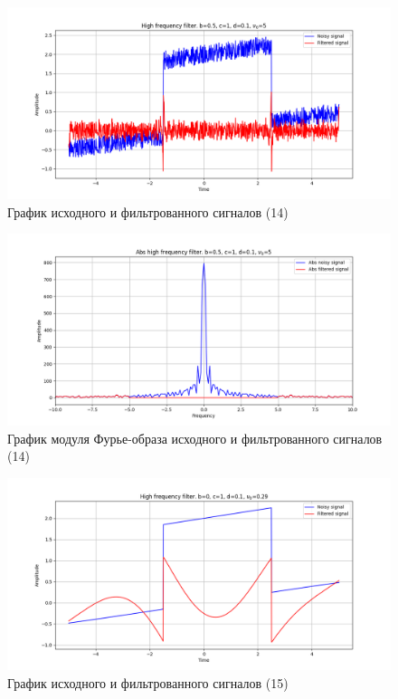 \documentclass[a4paper, 12pt]{article}
\begin{document}
    \begin{figure}[!htb]
        \centering
        \includegraphics[scale=0.48]{14_u_flt_u_nolow.png}
        \captionsetup{skip=0pt}
        \caption{График исходного и фильтрованного сигналов (14)}
        \label{fig:fig53}
    \end{figure}
    \begin{figure}[!htb]
        \centering
        \includegraphics[scale=0.48]{14_abs_u_U_nolow.png}
        \captionsetup{skip=0pt}
        \caption{График модуля Фурье-образа исходного и фильтрованного сигналов (14)}
        \label{fig:fig54}
    \end{figure}
    \begin{figure}[!htb]
        \centering
        \includegraphics[scale=0.48]{15_u_flt_u_nolow.png}
        \captionsetup{skip=0pt}
        \caption{График исходного и фильтрованного сигналов (15)}
        \label{fig:fig55}
    \end{figure}
\end{document}
